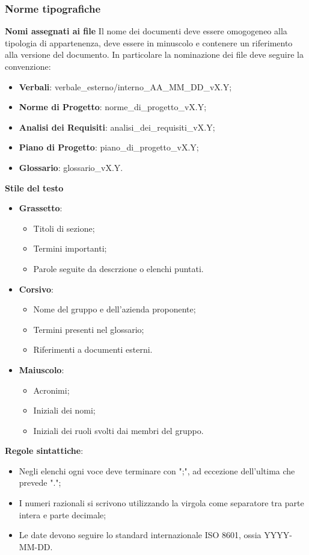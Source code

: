 \subsubsection{Norme tipografiche}
\textbf{Nomi assegnati ai file} Il nome dei documenti deve essere omogogeneo alla tipologia di appartenenza, deve essere in minuscolo
e contenere un riferimento alla versione del documento. In particolare la nominazione dei file deve seguire la convenzione:
\begin{itemize}
    \item \textbf{Verbali}: verbale\_esterno/interno\_AA\_MM\_DD\_vX.Y;
    \item \textbf{Norme di Progetto}: norme\_di\_progetto\_vX.Y;
    \item \textbf{Analisi dei Requisiti}: analisi\_dei\_requisiti\_vX.Y;
    \item \textbf{Piano di Progetto}: piano\_di\_progetto\_vX.Y;
    \item \textbf{Glossario}: glossario\_vX.Y.
\end{itemize}
\textbf{Stile del testo}
\begin{itemize}
    \item \textbf{Grassetto}:
    \begin{itemize}
        \item Titoli di sezione;
        \item Termini importanti;
        \item Parole seguite da descrzione o elenchi puntati.
    \end{itemize}
    \item \textbf{Corsivo}:
    \begin{itemize}
        \item Nome del gruppo e dell'azienda proponente;
        \item Termini presenti nel glossario;
        \item Riferimenti a documenti esterni.
    \end{itemize}
    \item \textbf{Maiuscolo}:
    \begin{itemize}
        \item Acronimi;
        \item Iniziali dei nomi;
        \item Iniziali dei ruoli svolti dai membri del gruppo.
    \end{itemize}
\end{itemize}
\textbf{Regole sintattiche}:
\begin{itemize}
    \item Negli elenchi ogni voce deve terminare con ";", ad eccezione dell'ultima che prevede ".";
    \item I numeri razionali si scrivono utilizzando la virgola come separatore tra parte intera e parte decimale;
    \item Le date devono seguire lo standard internazionale ISO 8601, ossia YYYY-MM-DD.
\end{itemize}

